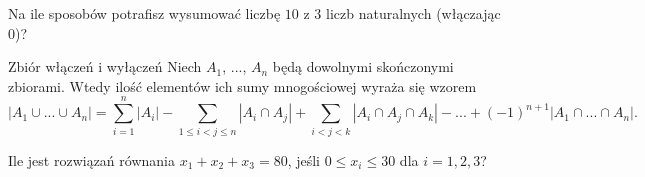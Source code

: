 \documentclass{article}
\begin{document}
%
%
%
%
%

\begin{zadanie}
  Na ile sposobów potrafisz wysumować liczbę $10$ z $3$ liczb naturalnych (włączając $0$)? 
\end{zadanie}

\begin{mybox}{Zbiór włączeń i wyłączeń}
  Niech $A_1$, ..., $A_n$ będą dowolnymi skończonymi zbiorami. Wtedy ilość elementów ich sumy mnogościowej wyraża się wzorem
  $$|A_1\cup...\cup A_n|=\sum_{i=1}^n|A_i|-\sum_{1\leq i< j\leq n}|A_i\cap A_j|+\sum_{i<j<k}|A_i\cap A_j\cap A_k|-...+(-1)^{n+1}|A_1\cap...\cap A_n|.$$
\end{mybox}

\begin{zadanie}
  Ile jest rozwiązań równania $x_1+x_2+x_3=80$, jeśli $0\leq x_i\leq 30$ dla $i=1,2,3$?
\end{zadanie}

\end{document}

